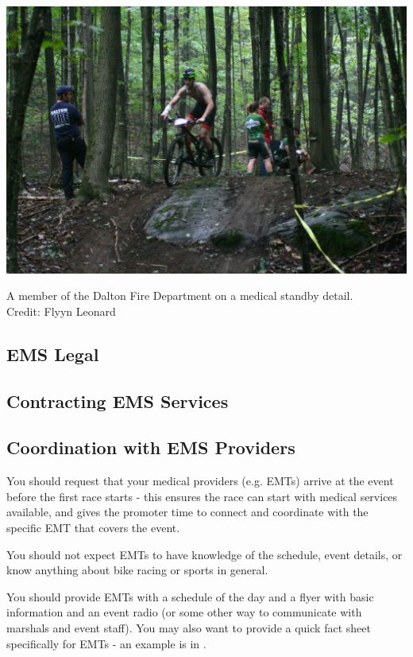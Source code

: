\documentclass[
  letterpaper, %
  fontsize=10pt, %
  twoside=true,
  chapterentrydots=true, %
  numbers=noenddot,
  fontmethod=tex,
]{kaobook}
\begin{document}
\begin{marginfigure}
\includegraphics{IMG_5836.jpg}
\caption[Medical Standby]{A member of the Dalton Fire Department on a medical standby detail.\\
          Credit: Flyyn Leonard}
\end{marginfigure}

\subsection{EMS Legal}

\subsection[Contracting]{Contracting EMS Services}

\subsection[EMS Coordination]{Coordination with EMS Providers}

You should request that your medical providers (e.g. EMTs)
arrive at the event before the first race starts -
this ensures the race can start with medical services available,
and gives the promoter time to connect and coordinate with the specific EMT
that covers the event.

You should not expect EMTs to have knowledge of the schedule, event details, or
know anything about bike racing or sports in general.

You should provide EMTs with a schedule of the day and a flyer with basic information
and an event radio (or some other way to communicate with marshals and event staff).
You may also want to provide a quick fact sheet specifically for EMTs - an example is in
.
\end{document}
